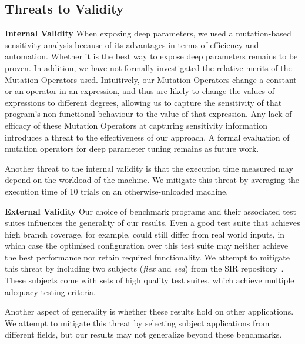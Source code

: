 
\subsection{Threats to Validity}

\textbf{Internal Validity}  When exposing deep parameters, we used a mutation-based sensitivity analysis because of its advantages in terms of efficiency and automation. Whether it is the best way to expose deep parameters remains to be proven. In addition, we have not formally investigated the relative merits of the Mutation Operators used. Intuitively, our Mutation Operators change a constant or an operator in an expression, and thus are likely to change the values of expressions to different degrees, allowing us to capture the sensitivity of that program's non-functional behaviour to the value of that expression. Any lack of efficacy of these Mutation Operators at capturing sensitivity information introduces a threat to the effectiveness of our approach. A formal evaluation of mutation operators for deep parameter tuning remains as future work.

Another threat to the internal validity is that the execution time measured
may depend on the workload of the machine. We mitigate this threat by
 averaging the execution time of 10 trials on an otherwise-unloaded machine. 

\textbf{External Validity}  Our choice of benchmark programs and their
associated test suites influences the generality of our results. 
Even a good test suite that achieves high branch coverage, for
example, could still differ from real world
inputs, in which case the optimised configuration over this test suite may
neither achieve the best performance nor retain required functionality.
We attempt to mitigate this threat by including two subjects (\emph{flex} and \emph{sed})
from the SIR repository~\cite{SIR2005}. These subjects come with
sets of high quality test suites, which achieve multiple adequacy 
testing criteria.

Another aspect of generality is whether these results hold on other
applications. We attempt to mitigate this threat by selecting subject
applications from different fields, but our results
may not generalize beyond these benchmarks. 
